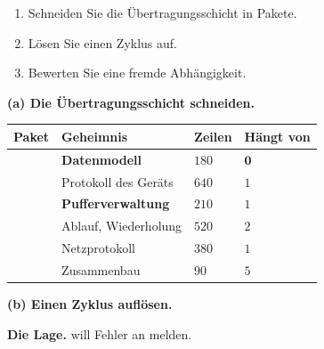 \begin{aufgabe}
\begin{enumerate}[label=(\alph*)]
\item Schneiden Sie die Übertragungsschicht in Pakete.
\item Lösen Sie einen Zyklus auf.
\item Bewerten Sie eine fremde Abhängigkeit.
\end{enumerate}

\loesung
\textbf{(a) Die Übertragungsschicht schneiden.}

\begin{center}
{\small
\renewcommand{\arraystretch}{1.45}
\begin{tabular}{@{}P{2.8cm}P{2.8cm}P{1.6cm}P{1.6cm}@{}}
\toprule
\textbf{Paket} & \textbf{Geheimnis} & \textbf{Zeilen} & \textbf{Hängt von}\\
\midrule
{} & \textbf{Datenmodell} & $180$ & $\mathbf{0}$\\
 & Protokoll des Geräts & $640$ & $1$\\
 & \textbf{Pufferverwaltung} & $210$ & $1$\\
 & Ablauf, Wiederholung & $520$ & $2$\\
 & Netzprotokoll & $380$ & $1$\\
 & Zusammenbau & $90$ & $5$\\
\bottomrule
\end{tabular}}
\end{center}

\begin{center}
\begin{minipage}{0.88\textwidth}
\end{minipage}
\end{center}

\begin{center}
\end{center}

\medskip
\textbf{(b) Einen Zyklus auflösen.}

\textbf{Die Lage.}  will Fehler an  melden.


\end{aufgabe}
